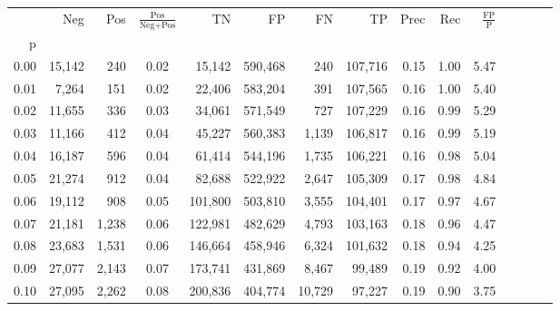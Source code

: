 \begin{tabular}{rrrcrrrrrrrrrrr}
\toprule
{} &     Neg &    Pos & $\frac{\text{Pos}}{\text{Neg}+\text{Pos}}$ &       TN &       FP &       FN &       TP &  Prec &   Rec & $\frac{\text{FP}}{\text{P}}$ \\
p    &         &        &                                            &          &          &          &          &       &       &                              \\
\midrule
0.00 &  15,142 &    240 &                                       0.02 &   15,142 &  590,468 &      240 &  107,716 &  0.15 &  1.00 &                         5.47 \\
0.01 &   7,264 &    151 &                                       0.02 &   22,406 &  583,204 &      391 &  107,565 &  0.16 &  1.00 &                         5.40 \\
0.02 &  11,655 &    336 &                                       0.03 &   34,061 &  571,549 &      727 &  107,229 &  0.16 &  0.99 &                         5.29 \\
0.03 &  11,166 &    412 &                                       0.04 &   45,227 &  560,383 &    1,139 &  106,817 &  0.16 &  0.99 &                         5.19 \\
0.04 &  16,187 &    596 &                                       0.04 &   61,414 &  544,196 &    1,735 &  106,221 &  0.16 &  0.98 &                         5.04 \\
0.05 &  21,274 &    912 &                                       0.04 &   82,688 &  522,922 &    2,647 &  105,309 &  0.17 &  0.98 &                         4.84 \\
0.06 &  19,112 &    908 &                                       0.05 &  101,800 &  503,810 &    3,555 &  104,401 &  0.17 &  0.97 &                         4.67 \\
0.07 &  21,181 &  1,238 &                                       0.06 &  122,981 &  482,629 &    4,793 &  103,163 &  0.18 &  0.96 &                         4.47 \\
0.08 &  23,683 &  1,531 &                                       0.06 &  146,664 &  458,946 &    6,324 &  101,632 &  0.18 &  0.94 &                         4.25 \\
0.09 &  27,077 &  2,143 &                                       0.07 &  173,741 &  431,869 &    8,467 &   99,489 &  0.19 &  0.92 &                         4.00 \\
0.10 &  27,095 &  2,262 &                                       0.08 &  200,836 &  404,774 &   10,729 &   97,227 &  0.19 &  0.90 &                         3.75 \\

\end{tabular}
